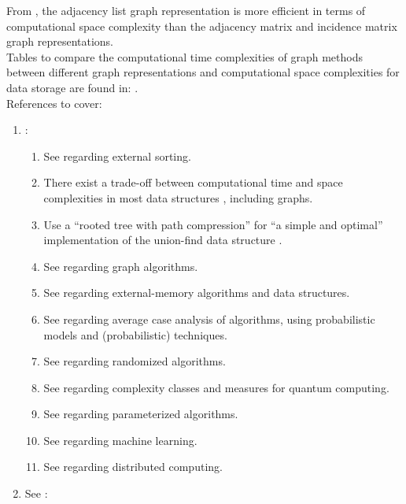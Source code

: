 From \cite{WikipediaContributors2018a49}, the adjacency list graph representation is more efficient in terms of computational space complexity than the adjacency matrix and incidence matrix graph representations. \\


Tables to compare the computational time complexities of graph methods between different graph representations and computational space complexities for data storage are found in: \cite[\S55.4 -- \S55.5, pp. 913]{Goldman2008}.
\\


References to cover: \vspace{-0.3cm}
\begin{enumerate} \itemsep -4pt
\item \cite[\S4-\S10, \S19, \S21-24, \S25-\S29]{Atallah2009}: \vspace{-0.3cm}
	\begin{enumerate} \itemsep -2pt
	\item See \cite[\S3]{Atallah2009} regarding external sorting.
	\item There exist a trade-off between computational time and space complexities in most data structures \cite[\S4.1.3, pp. 4-2]{Atallah2009}, including graphs.
	\item Use a ``rooted tree with path compression'' for ``a simple and optimal'' implementation of the union-find data structure \cite[\S4.1.4, pp. 4-3]{Atallah2009}.
	\item See \cite[\S7-\S9]{Atallah2009} regarding graph algorithms.
	\item See \cite[\S10]{Atallah2009} regarding external-memory algorithms and data structures. 
	\item See \cite[\S11]{Atallah2009} regarding average case analysis of algorithms, using probabilistic models and (probabilistic) techniques.
	\item See \cite[\S12]{Atallah2009} regarding randomized algorithms.
	\item See \cite[\S24]{Atallah2009} regarding complexity classes and measures for quantum computing.
	\item See \cite[\S25]{Atallah2009} regarding parameterized algorithms.
	\item See \cite[\S26]{Atallah2009} regarding machine learning.
	\item See \cite[\S29]{Atallah2009} regarding distributed computing.
	\end{enumerate}
\item See \cite{Atallah2009a}: \vspace{-0.3cm}

\end{enumerate}
